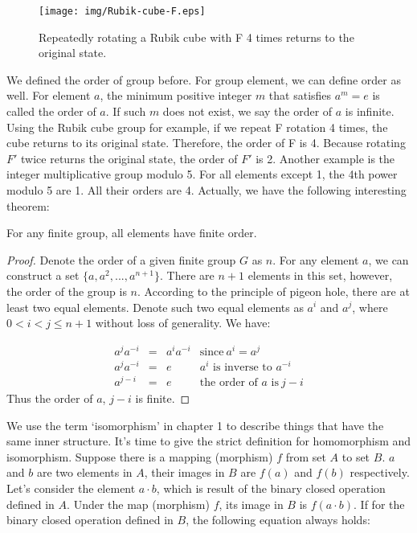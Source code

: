 \documentclass{article}
\begin{document}
\begin{figure}[htbp]
 \centering
 \texttt{[image: img/Rubik-cube-F.eps]}
 \caption{Repeatedly rotating a Rubik cube with F 4 times returns to the original state.}
 \label{fig:Rubik-cube-F}
\end{figure}

We defined the order of group before. For group element, we can define order as well. For element $a$, the minimum positive integer $m$ that satisfies $a^m = e$ is called the order of $a$. If such $m$ does not exist, we say the order of $a$ is infinite. Using the Rubik cube group for example, if we repeat F rotation 4 times, the cube returns to its original state. Therefore, the order of F is 4. Because rotating $F'$ twice returns the original state, the order of $F'$ is 2. Another example is the integer multiplicative group modulo 5. For all elements except 1, the 4th power modulo 5 are 1. All their orders are 4. Actually, we have the following interesting theorem:

\begin{theorem}
For any finite group, all elements have finite order.
\end{theorem}

\begin{proof}
Denote the order of a given finite group $G$ as $n$. For any element $a$, we can construct a set $\{a, a^2, ..., a^{n+1}\}$. There are $n + 1$ elements in this set, however, the order of the group is $n$. According to the principle of pigeon hole, there are at least two equal elements. Denote such two equal elements as $a^i$ and $a^j$, where $0 < i < j \leq n + 1$ without loss of generality. We have:

\[
\begin{array}{rcll}
a^ja^{-i} & = & a^{i}a^{-i} & \text{since}\ a^i = a^j \\
a^ja^{-i} & = & e & \text{$a^i$ is inverse to $a^{-i}$} \\
a^{j-i} & = & e & \text{the order of $a$ is}\ j - i
\end{array}
\]
Thus the order of $a$, $j - i$ is finite.
\end{proof}

We use the term `isomorphism' in chapter 1 to describe things that have the same inner structure. It's time to give the strict definition for homomorphism and isomorphism. Suppose there is a mapping (morphism) $f$ from set $A$ to set $B$. $a$ and $b$ are two elements in $A$, their images in $B$ are $f(a)$ and $f(b)$ respectively. Let's consider the element $a \cdot b$, which is result of the binary closed operation defined in $A$. Under the map (morphism) $f$, its image in $B$ is $f(a \cdot b)$. If for the binary closed operation defined in $B$, the following equation always holds:
\end{document}
